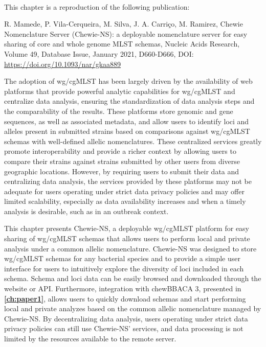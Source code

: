 \mbox{}\\
\vspace{8cm}

This chapter is a reproduction of the following publication:

R. Mamede, P. Vila-Cerqueira, M. Silva, J. A. Carriço, M. Ramirez, Chewie Nomenclature Server (Chewie-NS): a deployable nomenclature server for easy sharing of core and whole genome MLST schemas, Nucleic Acids Research, Volume 49, Database Issue, January 2021, D660-D666, DOI: \url{https://doi.org/10.1093/nar/gkaa889}

The adoption of \ac{wg/cgMLST} has been largely driven by the availability of web platforms that provide powerful analytic capabilities for \ac{wg/cgMLST} and centralize data analysis, ensuring the standardization of data analysis steps and the comparability of the results. These platforms store genomic and gene sequences, as well as associated metadata, and allow users to identify loci and alleles present in submitted strains based on comparisons against \ac{wg/cgMLST} schemas with well-defined allelic nomenclatures. These centralized services greatly promote interoperability and provide a richer context by allowing users to compare their strains against strains submitted by other users from diverse geographic locations. However, by requiring users to submit their data and centralizing data analysis, the services provided by these platforms may not be adequate for users operating under strict data privacy policies and may offer limited scalability, especially as data availability increases and when a timely analysis is desirable, such as in an outbreak context.

This chapter presents \ac{Chewie-NS}, a deployable \ac{wg/cgMLST} platform for easy sharing of \ac{wg/cgMLST} schemas that allows users to perform local and private analysis under a common allelic nomenclature. \ac{Chewie-NS} was designed to store \ac{wg/cgMLST} schemas for any bacterial species and to provide a simple user interface for users to intuitively explore the diversity of loci included in each schema. Schema and loci data can be easily browsed and downloaded through the website or \ac{API}. Furthermore, integration with chewBBACA 3, presented in \textbf{\autoref{ch:paper1}}, allows users to quickly download schemas and start performing local and private analyzes based on the common allelic nomenclature managed by \ac{Chewie-NS}. By decentralizing data analysis, users operating under strict data privacy policies can still use \ac{Chewie-NS}' services, and data processing is not limited by the resources available to the remote server.

